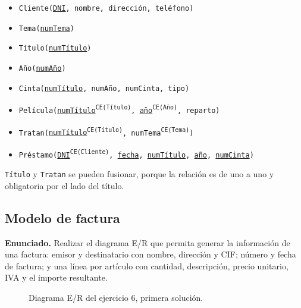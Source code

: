 \begin{itemize}[leftmargin=*]
    \item \texttt{Cliente(\underline{DNI}, nombre, dirección, teléfono)}
    \item \texttt{Tema(\underline{numTema})}
    \item \texttt{Título(\underline{numTítulo})}
    \item \texttt{Año(\underline{numAño})}
    \item \texttt{Cinta(\underline{numTítulo}, numAño, numCinta, tipo)}
    \item \texttt{Película(\underline{numTítulo}\textsuperscript{CE(Título)},
          \underline{año}\textsuperscript{CE(Año)}, reparto)}
    \item \texttt{Tratan(\underline{numTítulo}\textsuperscript{CE(Título)},
          numTema\textsuperscript{CE(Tema)})}
    \item \texttt{Préstamo(\underline{DNI}\textsuperscript{CE(Cliente)},
          \underline{fecha}, \underline{numTítulo}, \underline{año},
          \underline{numCinta})}
\end{itemize}

\texttt{Título} y \texttt{Tratan} se pueden fusionar, porque la relación es de
uno a uno y obligatoria por el lado del título.

\subsection{Modelo de factura}

\textbf{Enunciado.} Realizar el diagrama E/R que permita generar la información
de una factura: emisor y destinatario con nombre, dirección y CIF; número y
fecha de factura; y una línea por artículo con cantidad, descripción, precio
unitario, IVA y el importe resultante.

\begin{figure}[H]
\centering
{}
\caption{Diagrama E/R del ejercicio 6, primera solución.}
\end{figure}

